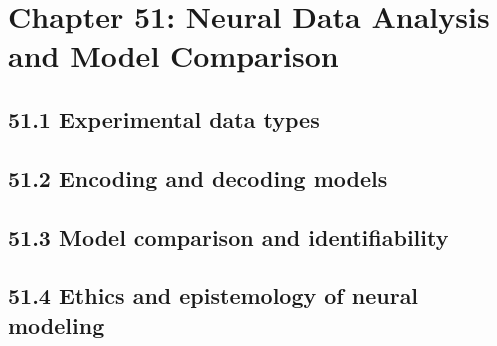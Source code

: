 \section{Chapter 51: Neural Data Analysis and Model Comparison}

\subsection{51.1 Experimental data types}

\subsection{51.2 Encoding and decoding models}

\subsection{51.3 Model comparison and identifiability}

\subsection{51.4 Ethics and epistemology of neural modeling}

\clearpage
